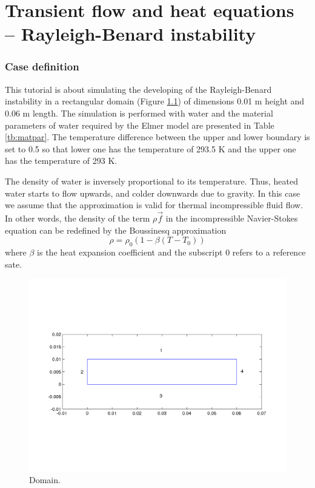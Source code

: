 \chapter{Transient flow and heat equations -- Rayleigh-Benard instability}



\subsection*{Case definition}

This tutorial is about simulating the developing of the
Rayleigh-Benard instability in a rectangular domain  (Figure
\ref{fg:rb_geometry}) of dimensions 0.01 m height and 0.06 m
length. The simulation is performed with water and the material
parameters of water required by the Elmer model are presented in Table \ref{tb:matpar}. The
temperature difference between the upper and lower boundary is set to
0.5 so that lower one has the temperature of  293.5 K and the upper
one has the temperature of 293 K.


The density of water is inversely proportional to its
temperature. Thus, heated water starts to flow upwards, and colder
downwards due to gravity.  In this case we assume that the
 approximation is valid for thermal incompressible
fluid flow. In other words, the density of the term $\rho$$\vec{f}$ in
the incompressible Navier-Stokes equation can be redefined by the
Boussinesq approximation
\begin{displaymath}
\rho = {\rho}_0(1-\beta(T-{T}_0))
\end{displaymath}
where $\beta$ is the heat expansion coefficient and the subscript 0 refers to a reference sate.


\begin{figure}[h]
\centering
\includegraphics[width=150 mm, height=55 mm]{rb_geometry}
\caption{Domain.}\label{fg:rb_geometry}
\end{figure}  


